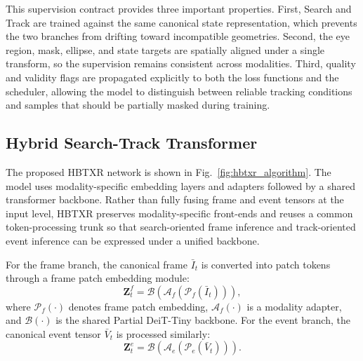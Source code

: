 ﻿\documentclass[journal]{IEEEtran}
\begin{document}
This supervision contract provides three important properties. First, Search and Track are trained against the same canonical state representation, which prevents the two branches from drifting toward incompatible geometries. Second, the eye region, mask, ellipse, and state targets are spatially aligned under a single transform, so the supervision remains consistent across modalities. Third, quality and validity flags are propagated explicitly to both the loss functions and the scheduler, allowing the model to distinguish between reliable tracking conditions and samples that should be partially masked during training.

\subsection{Hybrid Search-Track Transformer}

The proposed HBTXR network is shown in Fig.~\ref{fig:hbtxr_algorithm}. The model uses modality-specific embedding layers and adapters followed by a shared transformer backbone. Rather than fully fusing frame and event tensors at the input level, HBTXR preserves modality-specific front-ends and reuses a common token-processing trunk so that search-oriented frame inference and track-oriented event inference can be expressed under a unified backbone.

For the frame branch, the canonical frame \(\bar{I}_t\) is converted into patch tokens through a frame patch embedding module:
\begin{equation}
\mathbf{Z}^{f}_t = \mathcal{B}\!\left(\mathcal{A}_f\!\left(\mathcal{P}_f(\bar{I}_t)\right)\right),
\label{eq:frame_embed}
\end{equation}
where \(\mathcal{P}_f(\cdot)\) denotes frame patch embedding, \(\mathcal{A}_f(\cdot)\) is a modality adapter, and \(\mathcal{B}(\cdot)\) is the shared Partial DeiT-Tiny backbone. For the event branch, the canonical event tensor \(\bar{V}_t\) is processed similarly:
\begin{equation}
\mathbf{Z}^{e}_t = \mathcal{B}\!\left(\mathcal{A}_e\!\left(\mathcal{P}_e(\bar{V}_t)\right)\right).
\label{eq:event_embed}
\end{equation}
\end{document}
